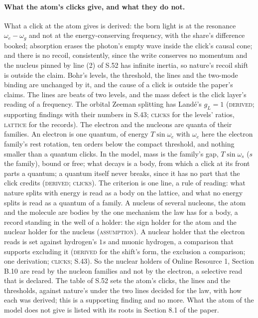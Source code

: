 \documentclass[pdflatex,sn-mathphys-num]{sn-jnl}
\newcommand{\claimmark}[1]{\textup{\textsc{#1}}}
\newcommand{\fence}[1]{\textup{\textsc{#1}}}
\theoremstyle{thmstyleone}
\begin{document}
\paragraph{What the atom's clicks give, and what they do not.} What a click at the atom gives is derived: the born light is at the resonance $\omega_e - \omega_g$ and not at the energy-conserving frequency, with the share's difference booked; absorption erases the photon's empty wave inside the click's causal cone; and there is no recoil, consistently, since the write conserves no momentum and the nucleus pinned by line (2) of S.52 has infinite inertia, so nature's recoil shift is outside the claim. Bohr's levels, the threshold, the lines and the two-mode binding are unchanged by it, and the cause of a click is outside the paper's claims. The lines are beats of two levels, and the mass defect is the click layer's reading of a frequency. The orbital Zeeman splitting has Land\'e's $g_L = 1$ (\claimmark{derived}; supporting findings with their numbers in S.43; \fence{clicks} for the levels' ratios, \fence{lattice} for the records). The electron and the nucleons are quanta of their families. An electron is one quantum, of energy $T\sin\omega_e$ with $\omega_e$ here the electron family's rest rotation, ten orders below the compact threshold, and nothing smaller than a quantum clicks. In the model, mass is the family's gap, $T\sin\omega_s$ ($s$ the family), bound or free; what decays is a body, from which a click at its front parts a quantum; a quantum itself never breaks, since it has no part that the click credits (\claimmark{derived}; \fence{clicks}). The criterion is one line, a rule of reading: what nature splits with energy is read as a body on the lattice, and what no energy splits is read as a quantum of a family. A nucleus of several nucleons, the atom and the molecule are bodies by the one mechanism the law has for a body, a record standing in the well of a holder: the sign holder for the atom and the nuclear holder for the nucleus (\claimmark{assumption}). A nuclear holder that the electron reads is set against hydrogen's $1s$ and muonic hydrogen, a comparison that supports excluding it (\claimmark{derived} for the shift's form, the exclusion a comparison; one derivation; \fence{clicks}; S.43). So the nuclear holders of Online Resource 1, Section B.10 are read by the nucleon families and not by the electron, a selective read that is declared. The table of S.52 sets the atom's clicks, the lines and the thresholds, against nature's under the two lines decided for the law, with how each was derived; this is a supporting finding and no more. What the atom of the model does not give is listed with its roots in Section 8.1 of the paper.
\end{document}
